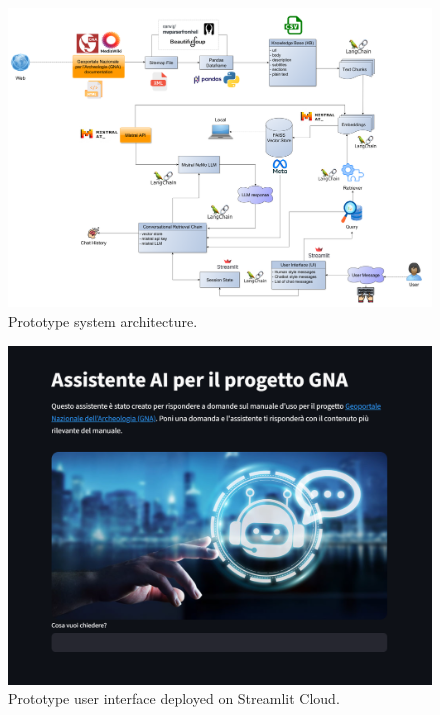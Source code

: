 \begin{spacing}{1.5}
\begin{figure}[H]
  \centering
  \includegraphics[width=\textwidth]{images/prototype_diagram.png} 
  \caption{Prototype system architecture.}
  \label{fig:protosys}
\end{figure}

\begin{figure}[H]
  \centering
  \includegraphics[width=\textwidth]{images/proto_UI.png} 
  \caption{Prototype user interface deployed on Streamlit Cloud.}
  \label{fig:proto_UI}
\end{figure}


\end{spacing}
